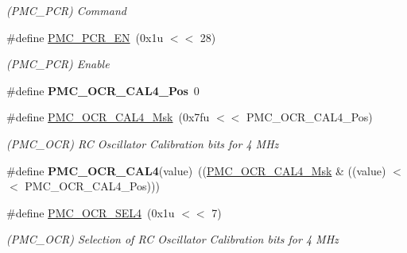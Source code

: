 \begin{DoxyCompactItemize}
\begin{DoxyCompactList}\small\item\em (P\+M\+C\+\_\+\+P\+CR) Command \end{DoxyCompactList}\item 
\mbox{\label{group__SAMV71__PMC_gaad56a2b89ddb060b1438188ededa22f6}} 
\#define \mbox{\hyperlink{group__SAMV71__PMC_gaad56a2b89ddb060b1438188ededa22f6}{P\+M\+C\+\_\+\+P\+C\+R\+\_\+\+EN}}~(0x1u $<$$<$ 28)
\begin{DoxyCompactList}\small\item\em (P\+M\+C\+\_\+\+P\+CR) Enable \end{DoxyCompactList}\item 
\mbox{\label{group__SAMV71__PMC_gaeb0974986596374c76e849079b3d55d2}} 
\#define {\bfseries P\+M\+C\+\_\+\+O\+C\+R\+\_\+\+C\+A\+L4\+\_\+\+Pos}~0
\item 
\mbox{\label{group__SAMV71__PMC_ga235fcd9ef2280ab09e882e6feab2fcb4}} 
\#define \mbox{\hyperlink{group__SAMV71__PMC_ga235fcd9ef2280ab09e882e6feab2fcb4}{P\+M\+C\+\_\+\+O\+C\+R\+\_\+\+C\+A\+L4\+\_\+\+Msk}}~(0x7fu $<$$<$ P\+M\+C\+\_\+\+O\+C\+R\+\_\+\+C\+A\+L4\+\_\+\+Pos)
\begin{DoxyCompactList}\small\item\em (P\+M\+C\+\_\+\+O\+CR) RC Oscillator Calibration bits for 4 M\+Hz \end{DoxyCompactList}\item 
\mbox{\label{group__SAMV71__PMC_gade8c1c8e3ba9b7608a2f284d754883b2}} 
\#define {\bfseries P\+M\+C\+\_\+\+O\+C\+R\+\_\+\+C\+A\+L4}(value)~((\mbox{\hyperlink{group__SAMV71__PMC_ga235fcd9ef2280ab09e882e6feab2fcb4}{P\+M\+C\+\_\+\+O\+C\+R\+\_\+\+C\+A\+L4\+\_\+\+Msk}} \& ((value) $<$$<$ P\+M\+C\+\_\+\+O\+C\+R\+\_\+\+C\+A\+L4\+\_\+\+Pos)))
\item 
\mbox{\label{group__SAMV71__PMC_ga66f57c76dd065ade034713e42feb7f66}} 
\#define \mbox{\hyperlink{group__SAMV71__PMC_ga66f57c76dd065ade034713e42feb7f66}{P\+M\+C\+\_\+\+O\+C\+R\+\_\+\+S\+E\+L4}}~(0x1u $<$$<$ 7)
\begin{DoxyCompactList}\small\item\em (P\+M\+C\+\_\+\+O\+CR) Selection of RC Oscillator Calibration bits for 4 M\+Hz \end{DoxyCompactList}\item 

\end{DoxyCompactItemize}
